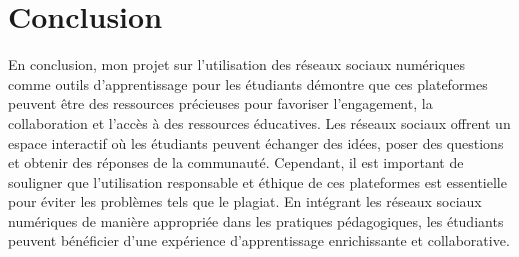 \documentclass[12pt,a4paper,titlepage]{article}
\begin{document}
\newpage
\section*{Conclusion }
En conclusion, mon projet sur l'utilisation des réseaux sociaux numériques comme outils d'apprentissage pour les étudiants démontre que ces plateformes peuvent être des ressources précieuses pour favoriser l'engagement, la collaboration et l'accès à des ressources éducatives. Les réseaux sociaux offrent un espace interactif où les étudiants peuvent échanger des idées, poser des questions et obtenir des réponses de la communauté. Cependant, il est important de souligner que l'utilisation responsable et éthique de ces plateformes est essentielle pour éviter les problèmes tels que le plagiat. En intégrant les réseaux sociaux numériques de manière appropriée dans les pratiques pédagogiques, les étudiants peuvent bénéficier d'une expérience d'apprentissage enrichissante et collaborative. 

\newpage


\end{document}
